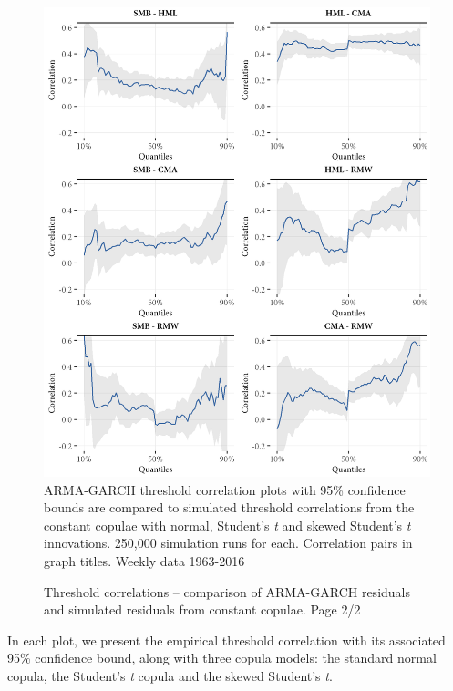 \begin{figure}[H]
  \caption{Threshold correlations -- comparison of ARMA-GARCH residuals and simulated residuals from constant copulae. Page 2/2}
  \label{fig:threshold_simulated2}
  \centering
  \begin{minipage}{\textwidth}
  \includegraphics[scale=1]{graphics/threshold_simulated2.png}  
  \vspace{3mm}
  \footnotesize
  ARMA-GARCH threshold correlation plots with 95\% confidence bounds are compared to simulated threshold correlations from the constant copulae with normal, Student's \textit{t} and skewed Student's \textit{t} innovations. 250,000 simulation runs for each. Correlation pairs in graph titles. Weekly data 1963-2016
  \end{minipage}
\end{figure}
In each plot, we present the empirical threshold correlation with its associated 95\% confidence bound, along with three copula models: the standard normal copula, the Student's \textit{t} copula and the skewed Student's \textit{t}.

